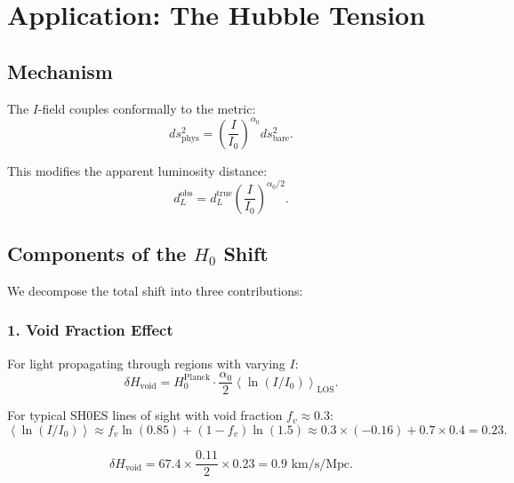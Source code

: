 \documentclass[12pt, a4paper]{article}
\begin{document}

\section{Application: The Hubble Tension}

\subsection{Mechanism}

The $I$-field couples conformally to the metric:
\begin{equation}
    ds^2_{\text{phys}} = \left(\frac{I}{I_0}\right)^{\alpha_0} ds^2_{\text{bare}}.
\end{equation}

This modifies the apparent luminosity distance:
\begin{equation}
    d_L^{\text{obs}} = d_L^{\text{true}} \left(\frac{I}{I_0}\right)^{\alpha_0/2}.
\end{equation}

\subsection{Components of the $H_0$ Shift}

We decompose the total shift into three contributions:

\subsubsection{1. Void Fraction Effect}

For light propagating through regions with varying $I$:
\begin{equation}
    \delta H_{\text{void}} = H_0^{\text{Planck}} \cdot \frac{\alpha_0}{2} \left\langle \ln(I/I_0) \right\rangle_{\text{LOS}}.
\end{equation}

For typical SH0ES lines of sight with void fraction $f_v \approx 0.3$:
\begin{equation}
    \left\langle \ln(I/I_0) \right\rangle \approx f_v \ln(0.85) + (1-f_v) \ln(1.5) \approx 0.3 \times (-0.16) + 0.7 \times 0.4 = 0.23.
\end{equation}

\begin{equation}
    \delta H_{\text{void}} = 67.4 \times \frac{0.11}{2} \times 0.23 = 0.9 \text{ km/s/Mpc}.
\end{equation}
\end{document}
